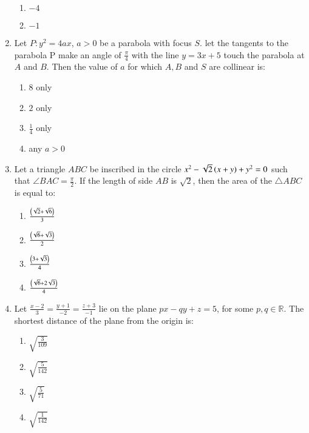 \documentclass[journal,12pt,onecolumn]{IEEEtran}
\theoremstyle{remark}
\begin{document}
\begin{enumerate}[start=1]
\begin{enumerate}
			\item $-4$\\
			\item $-1$\\
		\end{enumerate}
	\item Let $P:y^2=4ax$, $a>0$ be a parabola with focus $S$. let the tangents to the parabola P make an angle of $\frac{\pi}{4}$ with the line $y=3x+5$ touch the parabola at $A$ and $B$. Then the value of $a$ for which $A,B$ and $S$ are collinear is:
		\begin{enumerate}
			\item $8$ only\\
			\item $2$ only\\
			\item $\frac{1}{4}$ only\\
			\item any $a>0$\\
		\end{enumerate}
	\item Let a triangle $ABC$ be inscribed in the circle $x^2-\sqrt{2}\left(x+y\right)+y^2=0$ such that $\angle BAC=\frac{\pi}{2}$. If the length of side $AB$ is $\sqrt{2}$, then the area of the $\triangle ABC$ is equal to:
		\begin{enumerate}
			\item $\frac{\left(\sqrt{2}+\sqrt{6}\right)}{3}$\\
			\item $\frac{\left(\sqrt{6}+\sqrt{3}\right)}{2}$\\
			\item $\frac{\left(3+\sqrt{3}\right)}{4}$\\
			\item $\frac{\left(\sqrt{6}+2\sqrt{3}\right)}{4}$\\
		\end{enumerate}
	\item Let $\frac{x-2}{3}=\frac{y+1}{-2}=\frac{z+3}{-1}$ lie on the plane $px-qy+z=5$, for some $p, q\in\mathbb{R}$. The shortest distance of the plane from the origin is:
		\begin{enumerate}
			\item $\sqrt{\frac{3}{109}}$\\
			\item $\sqrt{\frac{5}{142}}$\\
			\item $\sqrt{\frac{5}{71}}$\\
			\item $\sqrt{\frac{1}{142}}$\\

\end{enumerate}
\end{enumerate}
\end{document}
